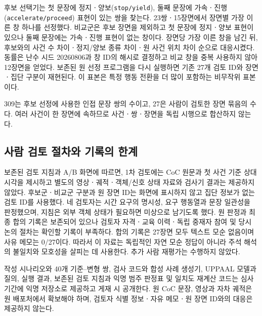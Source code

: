 \begin{revision}
후보 선택기는 첫 문장에 정지ㆍ양보(\texttt{stop/yield}), 둘째 문장에 가속ㆍ진행(\texttt{accelerate/proceed}) 표현이 있는 쌍을 찾는다. 23쌍ㆍ15장면에서 장면별 가장 이른 창 하나를 선정했다. 비교군은 후보 장면을 제외하고 첫 문장에 정지ㆍ양보 표현이 있으나 둘째 문장에는 가속ㆍ진행 표현이 없는 창이다. 장면당 가장 이른 창을 남긴 뒤, 후보와의 사건 수 차이ㆍ정지/양보 종류 차이ㆍ원 사건 위치 차이 순으로 대응시켰다. 동률은 난수 시드 20260806과 창 ID의 해시로 결정하고 비교 창을 중복 사용하지 않아 12장면을 얻었다. 보존된 원 선정 프로그램을 다시 실행하면 기존 27개 검토 ID와 장면ㆍ집단 구분이 재현된다. 이 표본은 특정 행동 전환을 더 많이 포함하는 비무작위 표본이다.

309는 후보 선정에 사용한 인접 문장 쌍의 수이고, 27은 사람이 검토한 장면 묶음의 수다. 여러 사건이 한 장면에 속하므로 사건ㆍ쌍ㆍ장면을 독립 시행으로 합산하지 않는다.

\subsection{사람 검토 절차와 기록의 한계}
\label{sec:review-protocol}
보존된 검토 지침과 A/B 화면에 따르면, 1차 검토에는 CoC 원문과 첫 사건 기준 상대 시각을 제시하고 별도의 영상ㆍ궤적ㆍ객체/신호 상태 자료와 검사기 결과는 제공하지 않았다. 후보군ㆍ비교군 구분과 원 장면 ID는 화면에 표시하지 않고 집단 정보가 없는 검토 ID를 사용했다. 네 검토자는 시간 요구의 명시성, 요구 행동열과 문장 일관성을 판정했으며, 지침은 외부 객체 상태가 필요하면 미상으로 남기도록 했다. 원 판정과 최종 합의 기록은 보존되어 있으나 검토자 자격ㆍ교육 이력ㆍ독립 중재자 참여 및 당시 논의 절차는 확인할 기록이 부족하다. 합의 기록은 27장면 모두 텍스트 모순 없음이며 사유 메모는 0/27이다. 따라서 이 자료는 독립적인 자연 모순 정답이 아니라 주석 해석의 불일치와 모호성을 살피는 데 사용한다. 추가 사람 재평가는 수행하지 않았다.

작성 시나리오와 40개 기준--변형 쌍, 검사 코드와 합성 사례 생성기, UPPAAL 모델과 질의, 실행 결과, 보존된 검토 지침과 익명 범주 판정표 및 일치도 재계산 코드는 심사 기간에 익명 저장소로 제공하고 게재 시 공개한다. 원 CoC 문장, 영상과 자차 궤적은 원 배포처에서 확보해야 하며, 검토자 식별 정보ㆍ자유 메모ㆍ원 장면 ID와의 대응은 제공하지 않는다.
\end{revision}
